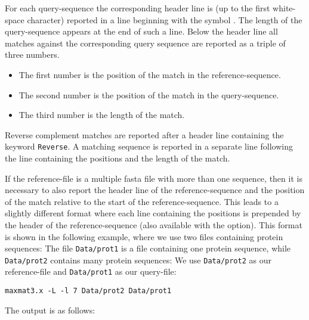 \documentclass[12pt]{article}
\begin{document}
For each query-sequence the corresponding header line is (up to the 
first white-space character) reported in a line beginning with the 
symbol \texttt{}. The length of the
query-sequence appears at the end of such a line. Below the header line 
all matches against the corresponding query sequence 
are reported as a triple of three numbers. 
\begin{itemize}
\item
The first number is the position of the match in the reference-sequence.
\item
The second number is the position of the match in the query-sequence.
\item
The third number is the length of the match. 
\end{itemize}
Reverse complement matches are reported after a header line containing the 
keyword \texttt{Reverse}. A matching sequence is reported in 
a separate line following the line containing the positions and the 
length of the match.  

If the reference-file is a multiple fasta file with more than one
sequence, then it is necessary to also report the header line of the
reference-sequence and the position of the match relative to the start
of the reference-sequence.  This leads to a slightly different format
where each line containing the positions is prepended by the header of
the reference-sequence (also available with the 
option). This format is shown in the following example, where we use
two files containing protein sequences: The file \texttt{Data/prot1}
is a file containing one protein sequence, while \texttt{Data/prot2}
contains many protein sequences: We use \texttt{Data/prot2} as our
reference-file and \texttt{Data/prot1} as our query-file:

\begin{verbatim}
maxmat3.x -L -l 7 Data/prot2 Data/prot1
\end{verbatim}

The output is as follows:
\end{document}
